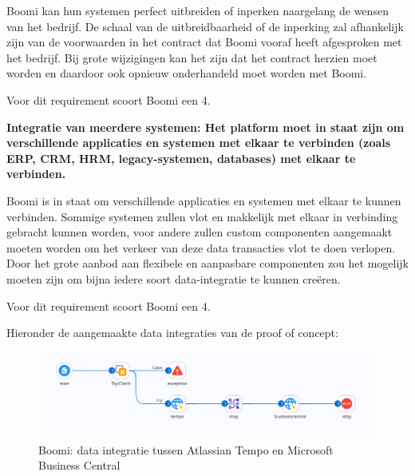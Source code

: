 \vspace{\baselineskip}

Boomi kan hun systemen perfect uitbreiden of inperken naargelang de wensen van het bedrijf. De schaal van de uitbreidbaarheid of de inperking zal afhankelijk zijn van de voorwaarden in het contract dat Boomi vooraf heeft afgesproken met het bedrijf. Bij grote wijzigingen kan het zijn dat het contract herzien moet worden en daardoor ook opnieuw onderhandeld moet worden met Boomi.

Voor dit requirement scoort Boomi een 4.


\vspace{\baselineskip}

\textbf{Integratie van meerdere systemen: Het platform moet in staat zijn om verschillende applicaties en systemen met elkaar te verbinden (zoals ERP, CRM, HRM, legacy-systemen, databases) met elkaar te verbinden.}

\vspace{\baselineskip}

Boomi is in staat om verschillende applicaties en systemen met elkaar te kunnen verbinden. Sommige systemen zullen vlot en makkelijk met elkaar in verbinding gebracht kunnen worden, voor andere zullen custom componenten aangemaakt moeten worden om het verkeer van deze data transacties vlot te doen verlopen. Door het grote aanbod aan flexibele en aanpasbare componenten zou het mogelijk moeten zijn om bijna iedere soort data-integratie te kunnen creëren.

Voor dit requirement scoort Boomi een 4.

\vspace{\baselineskip}

Hieronder de aangemaakte data integraties van de proof of concept:

\begin{figure}[H]
    \centering
    \includegraphics[width=\textwidth,height=\textheight,keepaspectratio]{../bachproef/images/Boomi_AtlassianTime.png}
    \caption{Boomi: data integratie tussen Atlassian Tempo en Microsoft Business Central}
\end{figure}

